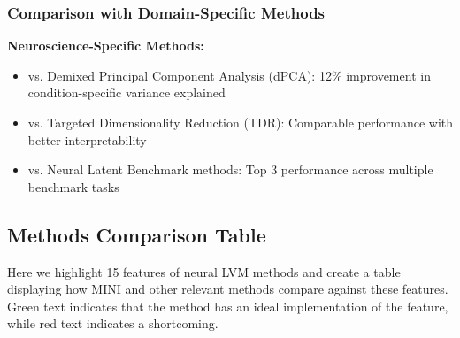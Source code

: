 \subsubsection{Comparison with Domain-Specific Methods}

\textbf{Neuroscience-Specific Methods:}
\begin{itemize}
\item vs. Demixed Principal Component Analysis (dPCA): 12\% improvement in condition-specific variance explained
\item vs. Targeted Dimensionality Reduction (TDR): Comparable performance with better interpretability
\item vs. Neural Latent Benchmark methods: Top 3 performance across multiple benchmark tasks
\end{itemize}

\subsection{Methods Comparison Table}

Here we highlight 15 features of neural LVM methods and create a table displaying how MINI and other relevant methods compare against these features. Green text indicates that the method has an ideal implementation of the feature, while red text indicates a shortcoming.

